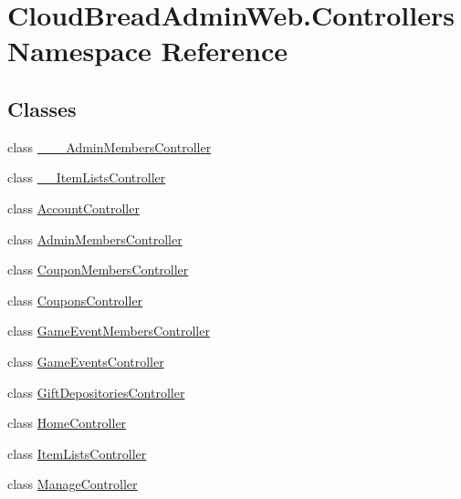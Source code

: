\hypertarget{namespace_cloud_bread_admin_web_1_1_controllers}{}\section{Cloud\+Bread\+Admin\+Web.\+Controllers Namespace Reference}
\label{namespace_cloud_bread_admin_web_1_1_controllers}
\subsection*{Classes}
\begin{DoxyCompactItemize}
\item 
class \hyperlink{class_cloud_bread_admin_web_1_1_controllers_1_1_______admin_members_controller}{\+\_\+\+\_\+\+\_\+\+Admin\+Members\+Controller}
\item 
class \hyperlink{class_cloud_bread_admin_web_1_1_controllers_1_1_____item_lists_controller}{\+\_\+\+\_\+\+Item\+Lists\+Controller}
\item 
class \hyperlink{class_cloud_bread_admin_web_1_1_controllers_1_1_account_controller}{Account\+Controller}
\item 
class \hyperlink{class_cloud_bread_admin_web_1_1_controllers_1_1_admin_members_controller}{Admin\+Members\+Controller}
\item 
class \hyperlink{class_cloud_bread_admin_web_1_1_controllers_1_1_coupon_members_controller}{Coupon\+Members\+Controller}
\item 
class \hyperlink{class_cloud_bread_admin_web_1_1_controllers_1_1_coupons_controller}{Coupons\+Controller}
\item 
class \hyperlink{class_cloud_bread_admin_web_1_1_controllers_1_1_game_event_members_controller}{Game\+Event\+Members\+Controller}
\item 
class \hyperlink{class_cloud_bread_admin_web_1_1_controllers_1_1_game_events_controller}{Game\+Events\+Controller}
\item 
class \hyperlink{class_cloud_bread_admin_web_1_1_controllers_1_1_gift_depositories_controller}{Gift\+Depositories\+Controller}
\item 
class \hyperlink{class_cloud_bread_admin_web_1_1_controllers_1_1_home_controller}{Home\+Controller}
\item 
class \hyperlink{class_cloud_bread_admin_web_1_1_controllers_1_1_item_lists_controller}{Item\+Lists\+Controller}
\item 
class \hyperlink{class_cloud_bread_admin_web_1_1_controllers_1_1_manage_controller}{Manage\+Controller}

\end{DoxyCompactItemize}
